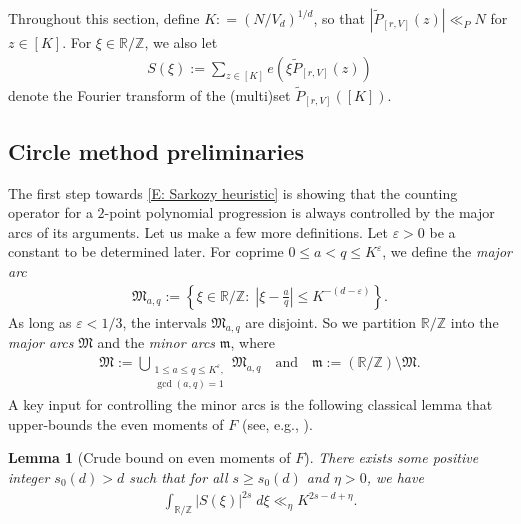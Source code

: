 \documentclass[11pt]{amsart}
\newtheorem{lemma}{Lemma}[section]
\theoremstyle{definition}
\newcommand{\R}{{\mathbb R}}
\newcommand{\Z}{{\mathbb Z}}
\newcommand{\veps}{\varepsilon}
\newcommand{\abs}[1]{\mathopen{}\left| #1\mathclose{}\right|}
\begin{document}
 Throughout this section, define $K: = (N/V_d)^{1/d}$, so that $|\widetilde{P}_{[r, V]}(z)|\ll_P N$ {for $z \in [K]$}.
For $\xi\in\R/\Z$, we also let
\begin{align*}
    S(\xi) := \sum_{z\in[K]}e(\xi \widetilde{P}_{[r, V]}(z))
\end{align*}
denote the Fourier transform of the (multi)set $\widetilde{P}_{[r, V]}([K])$.

\subsection{Circle method preliminaries}


The first step towards \eqref{E: Sarkozy heuristic} is showing that the counting operator for a $2$-point polynomial progression is always controlled by the major arcs of its arguments.  Let us make a few more definitions.  Let $\veps>0$ be a constant to be determined later. For coprime $0\leq a < q \leq K^\veps$, we define the \emph{major arc}
\begin{align*}
    \mathfrak{M}_{a,q} := \left\{\xi\in\R/\Z:\; \abs{\xi - \frac{a}{q}}\leq K^{-(d-\veps)}\right\}.
\end{align*}
As long as $\veps<1/3$, the intervals $\mathfrak{M}_{a,q}$ are disjoint.
So we partition $\R/\Z$ into the \emph{major arcs} $\mathfrak M$ and the \emph{minor arcs} $\mathfrak m$, where
\begin{align*}
    \mathfrak{M} := \bigcup_{\substack{1\leq a\leq q\leq K^\veps,\\ \gcd(a,q) = 1}}\mathfrak{M}_{a,q}
    \quad \textrm{and}\quad \mathfrak{m} := (\R/\Z)\setminus\mathfrak{M}.
\end{align*}
A key input for controlling the minor arcs is the following classical lemma that upper-bounds the even moments of $F$ (see, e.g., \cite[Corollary 14.2]{Wo19}). 
\begin{lemma}[Crude bound on even moments of $F$]\label{L: 4-th moment}
    There exists some positive integer $s_0(d) > d$ such that for all $s\geq s_0(d)$ and $\eta >0$, we have
    \begin{align*} 
        \int_{\R/\Z}\abs{S(\xi)}^{2s}\; d\xi  \ll_\eta K^{2s - d +\eta}.
    \end{align*}
\end{lemma}
\end{document}
